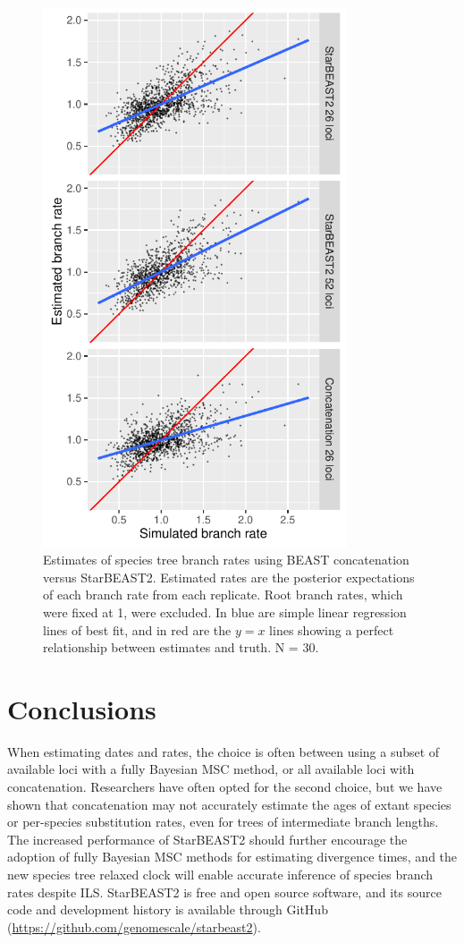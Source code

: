 \documentclass[12pt]{article}
\begin{document}
\begin{figure}[htb!]
\centering
\includegraphics[width=90mm]{branch_rates_phased.pdf}
\caption
{Estimates of species tree branch rates using BEAST concatenation versus
StarBEAST2. Estimated rates are the posterior expectations of each branch rate
from each replicate. Root branch rates, which were fixed at 1, were excluded.
In blue are simple linear regression lines of best fit, and in red are
the $y = x$ lines showing a perfect relationship between estimates and truth. N = 30.}
\label{fig:branchRates}
\end{figure}

\section{Conclusions}

When estimating dates and rates, the choice is often between using a subset of
available loci with a fully Bayesian MSC method, or all available loci with
concatenation. Researchers have often opted for the second choice, but we have
shown that concatenation may not accurately estimate the ages of extant species
or per-species substitution rates, even for trees of intermediate branch lengths. The
increased performance of StarBEAST2 should further encourage the adoption of
fully Bayesian MSC methods for estimating divergence times, and the new species
tree relaxed clock will enable accurate inference of species branch rates despite
ILS. StarBEAST2 is free and open source software, and its source code and
development history is available through GitHub
(\url{https://github.com/genomescale/starbeast2}).
\end{document}
